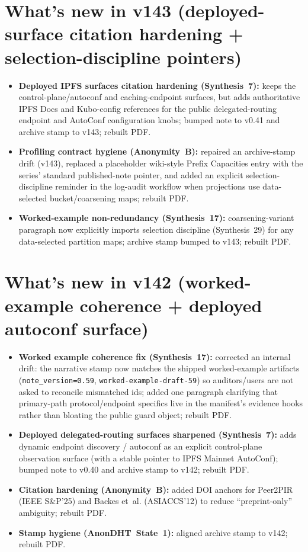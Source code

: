 \documentclass[11pt]{article}
\begin{document}
\section{What's new in v143 (deployed-surface citation hardening + selection-discipline pointers)}
\begin{itemize}[leftmargin=*]
\item \textbf{Deployed IPFS surfaces citation hardening (Synthesis~7):} keeps the control-plane/autoconf and caching-endpoint surfaces, but adds authoritative IPFS Docs and Kubo-config references for the public delegated-routing endpoint and AutoConf configuration knobs; bumped note to v0.41 and archive stamp to v143; rebuilt PDF.
\item \textbf{Profiling contract hygiene (Anonymity~B):} repaired an archive-stamp drift (v143), replaced a placeholder wiki-style Prefix Capacities entry with the series' standard published-note pointer, and added an explicit selection-discipline reminder in the log-audit workflow when projections use data-selected bucket/coarsening maps; rebuilt PDF.
\item \textbf{Worked-example non-redundancy (Synthesis~17):} coarsening-variant paragraph now explicitly imports selection discipline (Synthesis~29) for any data-selected partition maps; archive stamp bumped to v143; rebuilt PDF.
\end{itemize}

\section{What's new in v142 (worked-example coherence + deployed autoconf surface)}
\begin{itemize}[leftmargin=*]
\item \textbf{Worked example coherence fix (Synthesis~17):} corrected an internal drift: the narrative stamp now matches the shipped worked-example artifacts (\texttt{note\_version=0.59}, \texttt{worked-example-draft-59}) so auditors/users are not asked to reconcile mismatched ids; added one paragraph clarifying that primary-path protocol/endpoint specifics live in the manifest's evidence hooks rather than bloating the public guard object; rebuilt PDF.
\item \textbf{Deployed delegated-routing surfaces sharpened (Synthesis~7):} adds dynamic endpoint discovery / autoconf as an explicit control-plane observation surface (with a stable pointer to IPFS Mainnet AutoConf); bumped note to v0.40 and archive stamp to v142; rebuilt PDF.
\item \textbf{Citation hardening (Anonymity~B):} added DOI anchors for Peer2PIR (IEEE S\&P'25) and Backes et~al. (ASIACCS'12) to reduce ``preprint-only'' ambiguity; rebuilt PDF.
\item \textbf{Stamp hygiene (AnonDHT~State~1):} aligned archive stamp to v142; rebuilt PDF.
\end{itemize}
\end{document}
